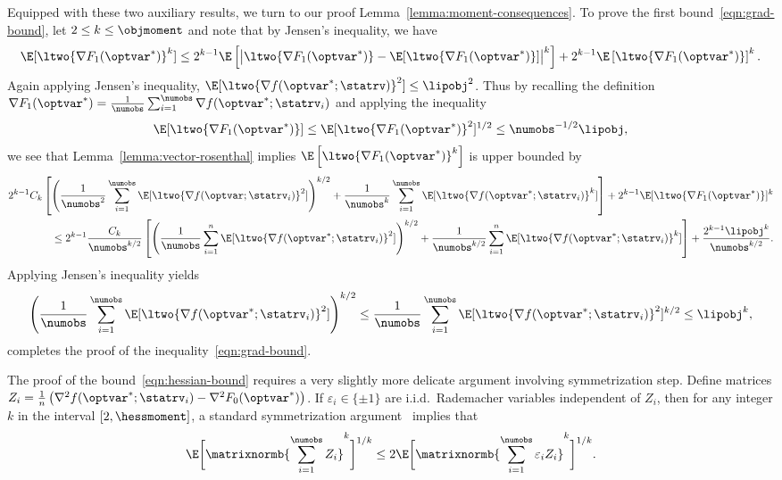 \documentclass[11pt,twoside]{article}
\theoremstyle{definition}
\begin{document}
Equipped with these two auxiliary results, we turn to our proof
Lemma~\ref{lemma:moment-consequences}.  To prove the first
bound~\eqref{eqn:grad-bound}, let $2 \le k \le \objmoment$ and note
that by Jensen's inequality, we have
\begin{equation*}
  \E[\ltwo{\nabla F_1(\optvar^*)}^k] \le 2^{k-1} \E\left[\big|
    \ltwo{\nabla F_1(\optvar^*)} - \E[\ltwo{\nabla
        F_1(\optvar^*)}]\big|^k \right] + 2^{k-1}
  \E\left[\ltwo{\nabla F_1(\optvar^*)}\right]^k.
\end{equation*}
Again applying Jensen's inequality, $\E[\ltwo{\nabla f(\optvar^*;
    \statrv)}^2] \le \lipobj^2$. Thus by recalling the definition
$\nabla F_1(\optvar^*) = \frac{1}{\numobs} \sum_{i=1}^\numobs \nabla
f(\optvar^*; \statrv_i)$ and applying the inequality
\begin{align*}
\E[\ltwo{\nabla F_1(\optvar^*)}] \le \E[\ltwo{\nabla
    F_1(\optvar^*)}^2]^{1/2} \le \numobs^{-1/2} \lipobj,
\end{align*}
we see that Lemma~\ref{lemma:vector-rosenthal} implies
$\E\left[\ltwo{\nabla F_1(\optvar^*)}^k\right]$ is upper bounded
by
\begin{align*}
  2^{k-1} C_k \left[\left(\frac{1}{\numobs^2} \sum_{i=1}^\numobs
    \E[\ltwo{\nabla f(\optvar; \statrv_i)}^2]\right)^{k/2} +
    \frac{1}{\numobs^k} \sum_{i = 1}^\numobs \E[\ltwo{\nabla
        f(\optvar^*; \statrv_i)}^k] \right] + 2^{k-1}\E[\ltwo{\nabla
      F_1(\optvar^*)}]^k \\ 
%
\le 2^{k-1} \frac{C_k}{\numobs^{k/2}}
  \left[\left(\frac{1}{\numobs} \sum_{i=1}^n \E[\ltwo{\nabla
        f(\optvar^*; \statrv_i)}^2] \right)^{k/2} + \frac{1}{\numobs^{k/2}}
    \sum_{i=1}^n \E[\ltwo{\nabla f(\optvar^*; \statrv_i)}^k] \right] +
  \frac{2^{k-1} \lipobj^k}{ \numobs^{k/2}}.
\end{align*}
Applying Jensen's inequality yields
\begin{equation*}
  \left(\frac{1}{\numobs} \sum_{i=1}^\numobs \E[\ltwo{\nabla
      f(\optvar^*; \statrv_i)}^2] \right)^{k/2} \le \frac{1}{\numobs}
  \sum_{i=1}^\numobs \E[\ltwo{\nabla f(\optvar^*; \statrv_i)}^2]^{k/2}
  \le \lipobj^k,
\end{equation*}
completes the proof of the inequality~\eqref{eqn:grad-bound}.

The proof of the bound~\eqref{eqn:hessian-bound} requires a very
slightly more delicate argument involving symmetrization step.
Define matrices $Z_i = \frac{1}{n} \left(\nabla^2 f(\optvar^*;
\statrv_i) - \nabla^2 F_0(\optvar^*)\right)$.  If $\varepsilon_i \in
\{\pm 1\}$ are i.i.d.\ Rademacher variables independent of $Z_i$, then
for any integer $k$ in the interval $[2, \hessmoment]$, a standard
symmetrization argument~\citep[e.g.][Lemma 6.3]{LedouxTa91} implies
that
\begin{equation}
  \E\bigg[\matrixnormb{
      \sum_{i=1}^\numobs Z_i}^k\bigg]^{1/k}
  \le 2 \E\bigg[
    \matrixnormb{\sum_{i=1}^\numobs \varepsilon_i Z_i}^k\bigg]^{1/k}.
  \label{eqn:symmetrization}
\end{equation}
\end{document}

